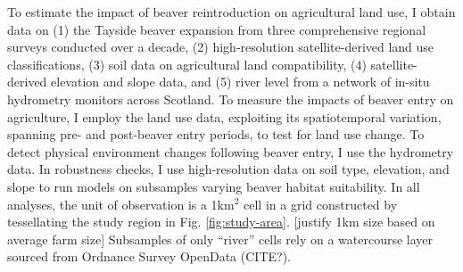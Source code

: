 To estimate the impact of beaver reintroduction on agricultural land use, I obtain data on (1) the Tayside beaver expansion from three comprehensive regional surveys conducted over a decade, (2) high-resolution satellite-derived land use classifications, (3) soil data on agricultural land compatibility, (4) satellite-derived elevation and slope data, and (5) river level from a network of in-situ hydrometry monitors across Scotland. To measure the impacts of beaver entry on agriculture, I employ the land use data, exploiting its spatiotemporal variation, spanning pre- and post-beaver entry periods, to test for land use change. To detect physical environment changes following beaver entry, I use the hydrometry data. In robustness checks, I use high-resolution data on soil type, elevation, and slope to run models on subsamples varying beaver habitat suitability. In all analyses, the unit of observation is a 1km$^2$ cell in a grid constructed by tessellating the study region in Fig. \ref{fig:study-area}. [justify 1km size based on average farm size] Subsamples of only ``river'' cells rely on a watercourse layer sourced from Ordnance Survey OpenData (CITE?).

